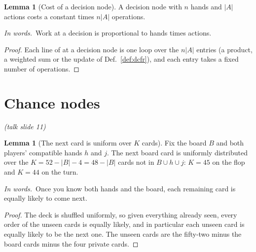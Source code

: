 \documentclass[11pt]{article}
\theoremstyle{definition}
\newtheorem{lemma}[definition]{Lemma}
\newcommand{\inwords}{\par\smallskip\noindent\textit{In words.}\ }
\newcommand{\Def}[1]{Def.~\ref{#1}}\newcommand{\Lem}[1]{Lemma~\ref{#1}}\newcommand{\Thm}[1]{Thm.~\ref{#1}}
\newcommand{\slide}[1]{\hfill{\small\itshape (talk slide #1)}}
\begin{document}
\begin{lemma}[Cost of a decision node]\label{lem:deccost}
A decision node with $n$ hands and $|A|$ actions costs a constant times $n|A|$ operations.
\inwords Work at a decision is proportional to hands times actions.
\end{lemma}
\begin{proof}
Each line of  at a decision node is one loop over the $n|A|$ entries (a product, a weighted sum or the
update of \Def{def:dcfr}), and each entry takes a fixed number of operations.
\end{proof}

\section{Chance nodes}\label{sec:chance}\slide{11}
\begin{lemma}[The next card is uniform over $K$ cards]\label{lem:uniform}
Fix the board $B$ and both players' compatible hands $h$ and $j$. The next board card is uniformly distributed over the
$K=52-|B|-4=48-|B|$ cards not in $B\cup h\cup j$: $K=45$ on the flop and $K=44$ on the turn.
\inwords Once you know both hands and the board, each remaining card is equally likely to come next.
\end{lemma}
\begin{proof}
The deck is shuffled uniformly, so given everything already seen, every order of the unseen cards is equally likely, and
in particular each unseen card is equally likely to be the next one. The unseen cards are the fifty-two minus the board
cards minus the four private cards.
\end{proof}
\end{document}
